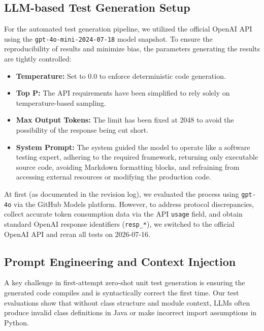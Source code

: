 \subsection{LLM-based Test Generation Setup}
\label{subsec:llm_setup}

For the automated test generation pipeline, we utilized the official OpenAI API
using the \texttt{gpt-4o-mini-2024-07-18} model snapshot.
To ensure the reproducibility of results and minimize bias, the parameters
generating the results are tightly controlled:
\begin{itemize}
    \item \textbf{Temperature:} Set to 0.0 to enforce deterministic code
    generation.
    \item \textbf{Top P:} The API requirements have been simplified to rely
    solely on temperature-based sampling.
    \item \textbf{Max Output Tokens:} The limit has been fixed at 2048 to avoid
    the possibility of the response being cut short.
    \item \textbf{System Prompt:} The system guided the model to operate like a
    software testing expert, adhering to the required framework, returning only
    executable source code, avoiding Markdown formatting blocks, and refraining
    from accessing external resources or modifying the production code.
\end{itemize}

At first (as documented in the revision log), we evaluated the process using
\texttt{gpt-4o} via the GitHub Models platform.
However, to address protocol discrepancies, collect accurate token consumption
data via the API \texttt{usage} field, and obtain standard OpenAI response
identifiers (\texttt{resp\_*}), we switched to the official OpenAI API and
reran all tests on 2026-07-16.

\subsection{Prompt Engineering and Context Injection}
\label{subsec:prompt_engineering}

A key challenge in first-attempt zero-shot unit test generation is ensuring the
generated code compiles and is syntactically correct the first time.
Our test evaluations show that without class structure and module context, LLMs
often produce invalid class definitions in Java or make incorrect import
assumptions in Python.

